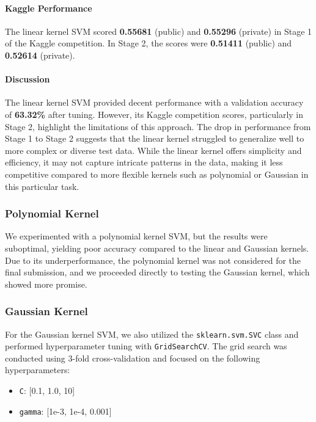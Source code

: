 \documentclass[12pt,a4paper]{article}
\begin{document}
\paragraph{Kaggle Performance}

The linear kernel SVM scored \textbf{0.55681} (public) and \textbf{0.55296} (private) in Stage 1 of the Kaggle competition. In Stage 2, the scores were \textbf{0.51411} (public) and \textbf{0.52614} (private).


\paragraph{Discussion}

The linear kernel SVM provided decent performance with a validation accuracy of \textbf{63.32\%} after tuning. However, its Kaggle competition scores, particularly in Stage 2, highlight the limitations of this approach. The drop in performance from Stage 1 to Stage 2 suggests that the linear kernel struggled to generalize well to more complex or diverse test data. While the linear kernel offers simplicity and efficiency, it may not capture intricate patterns in the data, making it less competitive compared to more flexible kernels such as polynomial or Gaussian in this particular task.


\subsubsection{Polynomial Kernel}

We experimented with a polynomial kernel SVM, but the results were suboptimal, yielding poor accuracy compared to the linear and Gaussian kernels. Due to its underperformance, the polynomial kernel was not considered for the final submission, and we proceeded directly to testing the Gaussian kernel, which showed more promise.


\subsubsection{Gaussian Kernel}

For the Gaussian kernel SVM, we also utilized the \texttt{sklearn.svm.SVC} class and performed hyperparameter tuning with \texttt{GridSearchCV}. The grid search was conducted using 3-fold cross-validation and focused on the following hyperparameters: \begin{itemize} \item \texttt{C}: [0.1, 1.0, 10] \item \texttt{gamma}: [1e-3, 1e-4, 0.001] \end{itemize}
\end{document}

